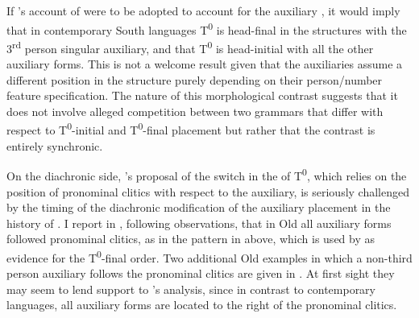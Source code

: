 \documentclass[output=paper,modfonts,newtxmath,hidelinks]{langscibook}
\begin{document}
\ea \label{11:ex11}
	\label{11:ex11a}
	\label{11:ex11b}
	\z
\z
If \citeauthor{pancheva2005}’s account of  were to be adopted to account for the auxiliary , it would imply that in contemporary South  languages T\textsuperscript{0} is head-final in the structures with the 3\textsuperscript{rd} person singular auxiliary, and that T\textsuperscript{0} is head-initial with all the other auxiliary forms. This is not a welcome result given that the auxiliaries assume a different position in the structure purely depending on their person/number feature specification. The nature of this morphological contrast suggests that it does not involve alleged competition between two grammars that differ with respect to T\textsuperscript{0}{}-initial and T\textsuperscript{0}{}-final placement but rather that the contrast is entirely synchronic.

\largerpage
On the diachronic side, \citeauthor{pancheva2005}’s proposal of the switch in the  of T\textsuperscript{0}, which relies on the position of pronominal clitics with respect to the auxiliary, is seriously challenged by the timing of the diachronic modification of the auxiliary placement in the history of . I report in \citet[283--284]{migdalski2016}, following  observations, that in Old  all auxiliary forms followed pronominal clitics, as in the pattern in  above, which is used by \citeauthor{pancheva2005} as evidence for the T\textsuperscript{0}{}-final order. Two additional Old  examples in which a non-third person auxiliary follows the pronominal clitics are given in . At first sight they may seem to lend support to \citeauthor{pancheva2005}'s analysis, since in contrast to contemporary  languages, all auxiliary forms are located to the right of the pronominal clitics.
\end{document}
